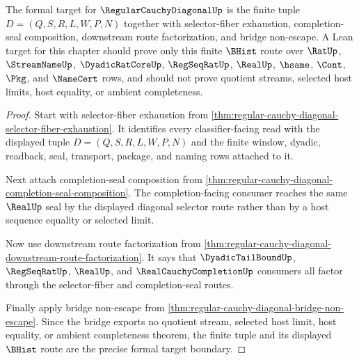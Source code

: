 \begin{theorem}
\label{thm:regular-cauchy-diagonal-formal-target-boundary}
The formal target for $\RegularCauchyDiagonalUp$ is the finite tuple $D=(Q,S,R,L,W,P,N)$ together with selector-fiber exhaustion, completion-seal composition, downstream route factorization, and bridge non-escape. A Lean target for this chapter should prove only this finite $\BHist$ route over $\RatUp$, $\StreamNameUp$, $\DyadicRatCoreUp$, $\RegSeqRatUp$, $\RealUp$, $\hsame$, $\Cont$, $\Pkg$, and $\NameCert$ rows, and should not prove quotient streams, selected host limits, host equality, or ambient completeness.
\end{theorem}
\begin{proof}
Start with selector-fiber exhaustion from \autoref{thm:regular-cauchy-diagonal-selector-fiber-exhaustion}. It identifies every classifier-facing read with the displayed tuple $D=(Q,S,R,L,W,P,N)$ and the finite window, dyadic, readback, seal, transport, package, and naming rows attached to it.

Next attach completion-seal composition from \autoref{thm:regular-cauchy-diagonal-completion-seal-composition}. The completion-facing consumer reaches the same $\RealUp$ seal by the displayed diagonal selector route rather than by a host sequence equality or selected limit.

Now use downstream route factorization from \autoref{thm:regular-cauchy-diagonal-downstream-route-factorization}. It says that $\DyadicTailBoundUp$, $\RegSeqRatUp$, $\RealUp$, and $\RealCauchyCompletionUp$ consumers all factor through the selector-fiber and completion-seal routes.

Finally apply bridge non-escape from \autoref{thm:regular-cauchy-diagonal-bridge-non-escape}. Since the bridge exports no quotient stream, selected host limit, host equality, or ambient completeness theorem, the finite tuple and its displayed $\BHist$ route are the precise formal target boundary.
\end{proof}

